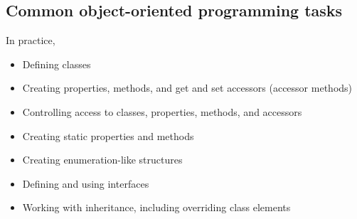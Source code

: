 \subsection{Common object-oriented programming tasks}

In practice, 
\begin{itemize}
	\item Defining classes
	\item Creating properties, methods, and get and set accessors (accessor
	methods) 
	\item Controlling access to classes, properties, methods, and accessors
	\item Creating static properties and methods
	\item Creating enumeration-like structures
	\item Defining and using interfaces
	\item Working with inheritance, including overriding class elements 
\end{itemize}

